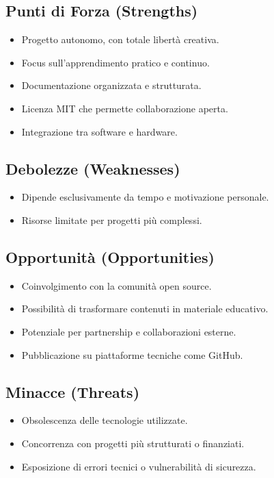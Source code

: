 \documentclass[10pt, a4paper, oneside]{article}
\begin{document}
\subsection*{Punti di Forza (Strengths)}
\begin{itemize}
  \item Progetto autonomo, con totale libertà creativa.
  \item Focus sull’apprendimento pratico e continuo.
  \item Documentazione organizzata e strutturata.
  \item Licenza MIT che permette collaborazione aperta.
  \item Integrazione tra software e hardware.
\end{itemize}

\subsection*{Debolezze (Weaknesses)}
\begin{itemize}
  \item Dipende esclusivamente da tempo e motivazione personale.
  \item Risorse limitate per progetti più complessi.
\end{itemize}

\subsection*{Opportunità (Opportunities)}
\begin{itemize}
  \item Coinvolgimento con la comunità open source.
  \item Possibilità di trasformare contenuti in materiale educativo.
  \item Potenziale per partnership e collaborazioni esterne.
  \item Pubblicazione su piattaforme tecniche come GitHub.
\end{itemize}

\subsection*{Minacce (Threats)}
\begin{itemize}
  \item Obsolescenza delle tecnologie utilizzate.
  \item Concorrenza con progetti più strutturati o finanziati.
  \item Esposizione di errori tecnici o vulnerabilità di sicurezza.
\end{itemize}
\end{document}
